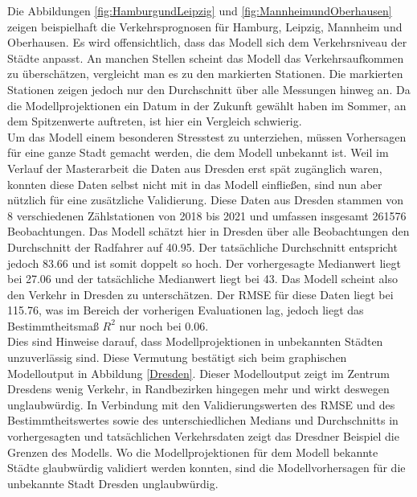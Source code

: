 \documentclass[a4paper,12pt]{thesis}
\begin{document}
Die Abbildungen \ref{fig:HamburgundLeipzig} und \ref{fig:MannheimundOberhausen} zeigen beispielhaft die Verkehrsprognosen für Hamburg, Leipzig, Mannheim und Oberhausen. Es wird offensichtlich, dass das Modell sich dem Verkehrsniveau der Städte anpasst. An manchen Stellen scheint das Modell das Verkehrsaufkommen zu überschätzen, vergleicht man es zu den markierten Stationen. Die markierten Stationen zeigen jedoch nur den Durchschnitt über alle Messungen hinweg an. Da die Modellprojektionen ein Datum in der Zukunft gewählt haben im Sommer, an dem Spitzenwerte auftreten, ist hier ein Vergleich schwierig.\\
Um das Modell einem besonderen Stresstest zu unterziehen, müssen Vorhersagen für eine ganze Stadt gemacht werden, die dem Modell unbekannt ist. Weil im Verlauf der Masterarbeit die Daten aus Dresden erst spät zugänglich waren, konnten diese Daten selbst nicht mit in das Modell einfließen, sind nun aber nützlich für eine zusätzliche Validierung. Diese Daten aus Dresden stammen von 8 verschiedenen Zählstationen von 2018 bis 2021 und umfassen insgesamt 261576 Beobachtungen. Das Modell schätzt hier in Dresden über alle Beobachtungen den Durchschnitt der Radfahrer auf 40.95. Der tatsächliche Durchschnitt entspricht jedoch 83.66 und ist somit doppelt so hoch. Der vorhergesagte Medianwert liegt bei 27.06 und der tatsächliche Medianwert liegt bei 43. Das Modell scheint also den Verkehr in Dresden zu unterschätzen. Der RMSE für diese Daten liegt bei 115.76, was im Bereich der vorherigen Evaluationen lag, jedoch liegt das Bestimmtheitsmaß $R^2$ nur noch bei 0.06.\\
Dies sind Hinweise darauf, dass Modellprojektionen in unbekannten Städten unzuverlässig sind. Diese Vermutung bestätigt sich beim graphischen Modelloutput in Abbildung \ref{Dresden}. Dieser Modelloutput zeigt im Zentrum Dresdens wenig Verkehr, in Randbezirken hingegen mehr und wirkt deswegen unglaubwürdig. In Verbindung mit den Validierungswerten des RMSE und des Bestimmtheitswertes sowie des unterschiedlichen Medians und Durchschnitts in vorhergesagten und tatsächlichen Verkehrsdaten zeigt das Dresdner Beispiel die Grenzen des Modells. Wo die Modellprojektionen für dem Modell bekannte Städte glaubwürdig validiert werden konnten, sind die Modellvorhersagen für die unbekannte Stadt Dresden unglaubwürdig.
\end{document}

